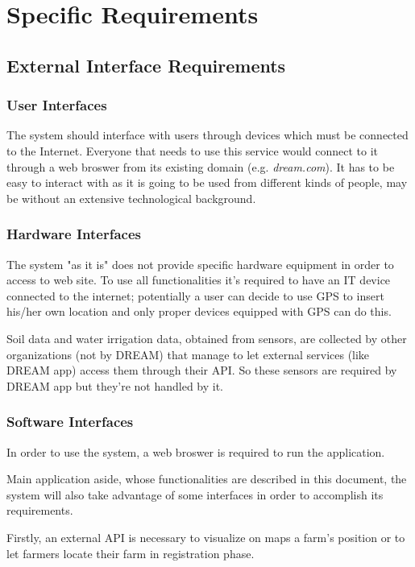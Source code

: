 \documentclass[table, 12pt]{article}
\begin{document}
\section{Specific Requirements}

\subsection{External Interface Requirements}

\subsubsection{User Interfaces}
The system should interface with users through devices which must be connected to the Internet.
Everyone that needs to use this service would connect to it through a web broswer from its existing domain (e.g. \textit{dream.com}).
It has to be easy to interact with as it is going to be used from different kinds of people, may be without an extensive technological background.

\subsubsection{Hardware Interfaces}
\label{hardware_interfaces}
The system "as it is" does not provide specific hardware equipment in order to access to web site. To use all functionalities it's required to have an IT device connected to the internet; potentially a user can decide to use GPS to insert his/her own location and only proper devices equipped with GPS can do this. 

Soil data and water irrigation data, obtained from sensors, are collected by other organizations (not by DREAM) that manage to let external services (like DREAM app) access them through their API. So these sensors are required by DREAM app but they're not handled by it.

\subsubsection{Software Interfaces}
\label{software_interfaces}
In order to use the system, a web broswer is required to run the application.

Main application aside, whose functionalities are described in this document, the system will also take advantage of some interfaces in order to accomplish its requirements.

Firstly, an external API is necessary to visualize on maps a farm's position or to let farmers locate their farm in registration phase.
\end{document}
